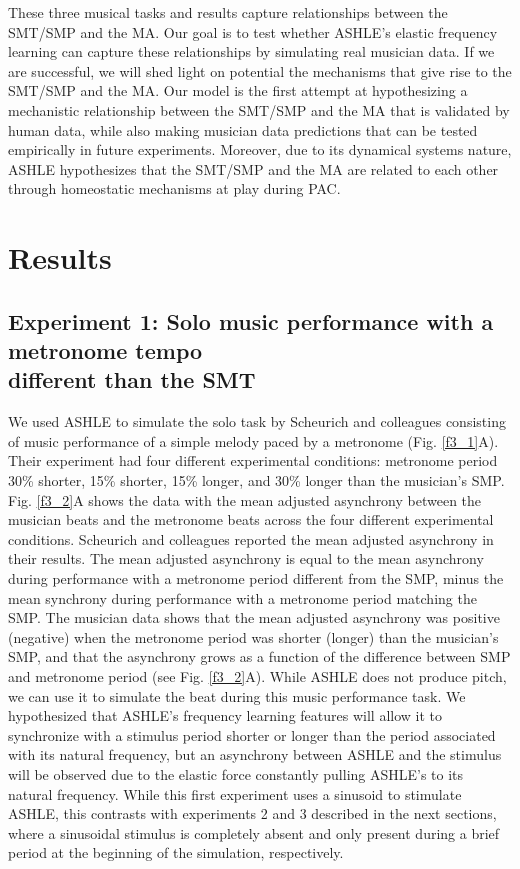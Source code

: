 \documentclass{report}
\begin{document}
These three musical tasks and results capture relationships between the SMT/SMP and the MA. Our goal is to test whether ASHLE's elastic frequency learning can capture these relationships by simulating real musician data. If we are successful, we will shed light on potential the mechanisms that give rise to the SMT/SMP and the MA. Our model is the first attempt at hypothesizing a mechanistic relationship between the SMT/SMP and the MA that is validated by human data, while also making musician data predictions that can be tested empirically in future experiments. Moreover, due to its dynamical systems nature, ASHLE hypothesizes that the SMT/SMP and the MA are related to each other through homeostatic mechanisms at play during PAC.

\section{Results}

\subsection{Experiment 1: Solo music performance with a metronome tempo \\ different than the SMT}

We used ASHLE to simulate the solo task by Scheurich and colleagues \cite{scheurich2018tapping} consisting of music performance of a simple melody paced by a metronome (Fig.{} \ref{f3_1}A). Their experiment had four different experimental conditions: metronome period 30\% shorter, 15\% shorter, 15\% longer, and 30\% longer than the musician's SMP. Fig.{} \ref{f3_2}A shows the data with the mean adjusted asynchrony between the musician beats and the metronome beats across the four different experimental conditions. Scheurich and colleagues \cite{scheurich2018tapping} reported the mean adjusted asynchrony in their results. The mean adjusted asynchrony is equal to the mean asynchrony during performance with a metronome period different from the SMP, minus the mean synchrony during performance with a metronome period matching the SMP. The musician data shows that the mean adjusted asynchrony was positive (negative) when the metronome period was shorter (longer) than the musician's SMP, and that the asynchrony grows as a function of the difference between SMP and metronome period (see Fig.{} \ref{f3_2}A). While ASHLE does not produce pitch, we can use it to simulate the beat during this music performance task. We hypothesized that ASHLE's frequency learning features will allow it to synchronize with a stimulus period shorter or longer than the period associated with its natural frequency, but an asynchrony between ASHLE and the stimulus will be observed due to the elastic force constantly pulling ASHLE's to its natural frequency. While this first experiment uses a sinusoid to stimulate ASHLE, this contrasts with experiments 2 and 3 described in the next sections, where a sinusoidal stimulus is completely absent and only present during a brief period at the beginning of the simulation, respectively.
\end{document}
